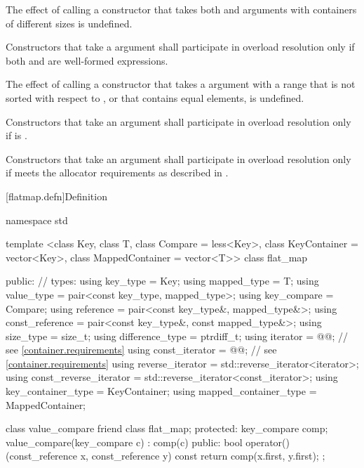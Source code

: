 \begin{codeblock}
\begin{codeblock}
\begin{codeblock}
\begin{addedblock}
\pnum
The effect of calling a constructor that takes both 
and  arguments with containers of different sizes is
undefined.

\pnum
Constructors that take a  argument  shall
participate in overload resolution only if both  and
 are well-formed expressions.

\pnum
The effect of calling a constructor that takes a 
argument with a range that is not sorted with respect to , or
that contains equal elements, is undefined.

\pnum
Constructors that take an  argument shall participate in overload
resolution only if  is .

\pnum
Constructors that take an  argument shall participate in overload
resolution only if  meets the allocator requirements as described
in .

[flatmap.defn]{Definition}

\begin{codeblock}
namespace std {
  template <class Key, class T, class Compare = less<Key>,
            class KeyContainer = vector<Key>,
            class MappedContainer = vector<T>>
  class flat_map {
  public:
    // types:
    using key_type                  = Key;
    using mapped_type               = T;
    using value_type                = pair<const key_type, mapped_type>;
    using key_compare               = Compare;
    using reference                 = pair<const key_type&, mapped_type&>;
    using const_reference           = pair<const key_type&, const mapped_type&>;
    using size_type                 = size_t;
    using difference_type           = ptrdiff_t;
    using iterator                  = @@; // see \ref{container.requirements}
    using const_iterator            = @@; // see \ref{container.requirements}
    using reverse_iterator          = std::reverse_iterator<iterator>;
    using const_reverse_iterator    = std::reverse_iterator<const_iterator>;
    using key_container_type        = KeyContainer;
    using mapped_container_type     = MappedContainer;

    class value_compare {
      friend class flat_map;
    protected:
      key_compare comp;
      value_compare(key_compare c) : comp(c) { }
    public:
      bool operator()(const_reference x, const_reference y) const {
        return comp(x.first, y.first);
      }
    };

}}
\end{codeblock}
\end{addedblock}
\end{codeblock}
\end{codeblock}
\end{codeblock}
